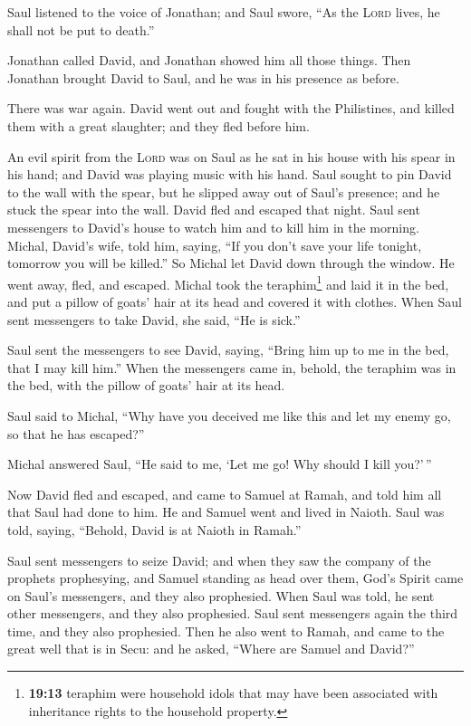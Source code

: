  Saul listened to the voice of Jonathan; and Saul swore,
``As the \textsc{Lord} lives, he shall not be put to death.''

 Jonathan called David, and Jonathan showed him all those
things. Then Jonathan brought David to Saul, and he was in his presence
as before.

 There was war again. David went out and fought with the
Philistines, and killed them with a great slaughter; and they fled
before him.

 An evil spirit from the \textsc{Lord} was on Saul as he
sat in his house with his spear in his hand; and David was playing music
with his hand.  Saul sought to pin David to the wall with
the spear, but he slipped away out of Saul's presence; and he stuck the
spear into the wall. David fled and escaped that night. 
Saul sent messengers to David's house to watch him and to kill him in
the morning. Michal, David's wife, told him, saying, ``If you don't save
your life tonight, tomorrow you will be killed.''  So
Michal let David down through the window. He went away, fled, and
escaped.  Michal took the teraphim\footnote{\textbf{19:13}
  teraphim were household idols that may have been associated with
  inheritance rights to the household property.} and laid it in the bed,
and put a pillow of goats' hair at its head and covered it with clothes.
 When Saul sent messengers to take David, she said, ``He
is sick.''

 Saul sent the messengers to see David, saying, ``Bring
him up to me in the bed, that I may kill him.''  When the
messengers came in, behold, the teraphim was in the bed, with the pillow
of goats' hair at its head.

 Saul said to Michal, ``Why have you deceived me like
this and let my enemy go, so that he has escaped?''

Michal answered Saul, ``He said to me, `Let me go! Why should I kill
you?'\,''

 Now David fled and escaped, and came to Samuel at Ramah,
and told him all that Saul had done to him. He and Samuel went and lived
in Naioth.  Saul was told, saying, ``Behold, David is at
Naioth in Ramah.''

 Saul sent messengers to seize David; and when they saw
the company of the prophets prophesying, and Samuel standing as head
over them, God's Spirit came on Saul's messengers, and they also
prophesied.  When Saul was told, he sent other
messengers, and they also prophesied. Saul sent messengers again the
third time, and they also prophesied.  Then he also went
to Ramah, and came to the great well that is in Secu: and he asked,
``Where are Samuel and David?''

